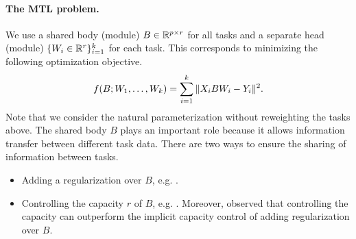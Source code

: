 \paragraph{The MTL problem.}
We use a shared body (module) $B\in\mathbb{R}^{p\times r}$ for all tasks and a separate head (module) $\{W_i \in \mathbb{R}^{r}\}_{i=1}^k$ for each task.
This corresponds to minimizing the following optimization objective.
\begin{align}
	\label{eq_mtl}
	f(B; W_1, \dots, W_k) = \sum_{i=1}^k \|X_i B W_i - Y_i\|^2.
\end{align}
Note that we consider the natural parameterization without reweighting the tasks above.
The shared body $B$ plays an important role because it allows information transfer between different task data.
There are two ways to ensure the sharing of information between tasks.
\begin{itemize}
	\item Adding a regularization over $B$, e.g. \cite{LPTV09,LPVT11}.
	\item Controlling the capacity $r$ of $B$, e.g. \cite{KD12,WZR20}. Moreover, \cite{KD12} observed that controlling the capacity can outperform the implicit capacity control of adding regularization over $B$.
\end{itemize}

